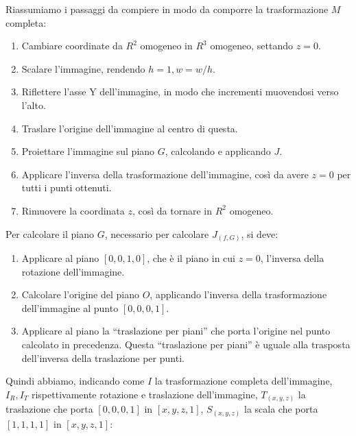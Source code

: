 Riassumiamo i passaggi da compiere in modo da comporre la trasformazione $M$ completa:
\begin{enumerate}
    \item Cambiare coordinate da $R^2$ omogeneo in $R^3$ omogeneo, settando $z=0$.
    \item Scalare l'immagine, rendendo $h = 1, w = w/h$.
    \item Riflettere l'asse Y dell'immagine, in modo che incrementi muovendosi verso l'alto.
    \item Traslare l'origine dell'immagine al centro di questa.
    \item Proiettare l'immagine sul piano $G$, calcolando e applicando $J$.
    \item Applicare l'inversa della trasformazione dell'immagine, così da avere $z=0$ per tutti i punti ottenuti.
    \item Rimuovere la coordinata $z$, così da tornare in $R^2$ omogeneo.
\end{enumerate}
Per calcolare il piano $G$, necessario per calcolare $J_{(f, G)}$, si deve:
\begin{enumerate}
    \item Applicare al piano $[0, 0, 1, 0]$, che è il piano in cui $z=0$, l'inversa della rotazione dell'immagine.
    \item Calcolare l'origine del piano $O$, applicando l'inversa della trasformazione dell'immagine al punto $[0, 0, 0, 1]$.
    \item Applicare al piano la ``traslazione per piani'' che porta l'origine nel punto calcolato in precedenza. Questa ``traslazione per piani'' è uguale alla trasposta dell'inversa della traslazione per punti.
\end{enumerate}
Quindi abbiamo, indicando come $I$ la trasformazione completa dell'immagine, $I_R, I_T$ rispettivamente rotazione e traslazione dell'immagine, $T_{(x, y, z)}$ la traslazione che porta $[0, 0, 0, 1]$ in $[x, y, z, 1]$, $S_{(x, y, z)}$ la scala che porta $[1, 1, 1, 1]$ in $[x, y, z, 1]$:
